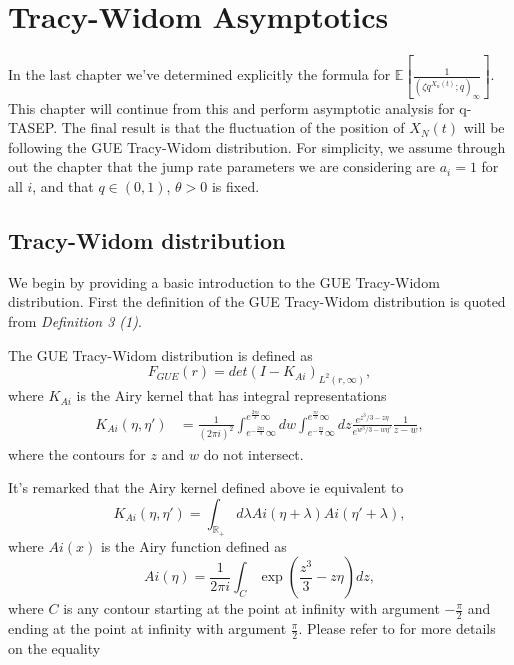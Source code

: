 \chapter{Tracy-Widom Asymptotics}
In the last chapter we've determined explicitly the formula for $\mathbb{E}\left[ \frac{1}{(\zeta q^{X_n(t)}; q)_{\infty}} \right]$. This chapter will continue from this and perform asymptotic analysis for q-TASEP. The final result is that the fluctuation of the position of $X_N(t)$ will be following the GUE Tracy-Widom distribution. For simplicity, we assume through out the chapter that the jump rate parameters we are considering are $a_i = 1$ for all $i$, and that $q \in (0,1)$, $\theta > 0$ is fixed. 

\section{Tracy-Widom distribution}
We begin by providing a basic introduction to the GUE Tracy-Widom distribution. First the definition of the GUE Tracy-Widom distribution is quoted from \cite{phase2015} \textit{Definition 3 (1)}.

\begin{definition}
The GUE Tracy-Widom distribution is defined as $$F_{GUE}(r) = det(I-K_{Ai})_{L^2(r, \infty)},$$ where $K_{Ai}$ is the Airy kernel that has integral representations 
\begin{align*}
K_{Ai}(\eta, \eta') &= \frac{1}{(2 \pi i)^2} \int_{e^{-\frac{2 \pi i}{3}} \infty}^{e^{\frac{2 \pi i}{3}} \infty} dw \int_{e^{-\frac{\pi i}{3}} \infty}^{e^{\frac{\pi i}{3}} \infty} dz \frac{e^{z^3 / 3 - z \eta}}{e^{w^3 / 3 - w \eta'}} \frac{1}{z-w},
\end{align*}
where the contours for $z$ and $w$ do not intersect. 
\end{definition}
\begin{remark}
It's remarked that the Airy kernel defined above ie equivalent to $$K_{Ai}(\eta, \eta') = \int_{\mathbb{R}_+} d\lambda Ai(\eta+\lambda) Ai(\eta' + \lambda),$$
where $Ai(x)$ is the Airy function defined as
$$Ai(\eta) = \frac{1}{2 \pi i} \int_{C} \exp (\frac{z^3}{3} - z \eta) dz,$$ where $C$ is any contour starting at the point at infinity with argument $-\frac{\pi}{2}$ and ending at the point at infinity with argument $\frac{\pi}{2}$. Please refer to \cite{airy-kernel} for more details on the equality
\end{remark}

